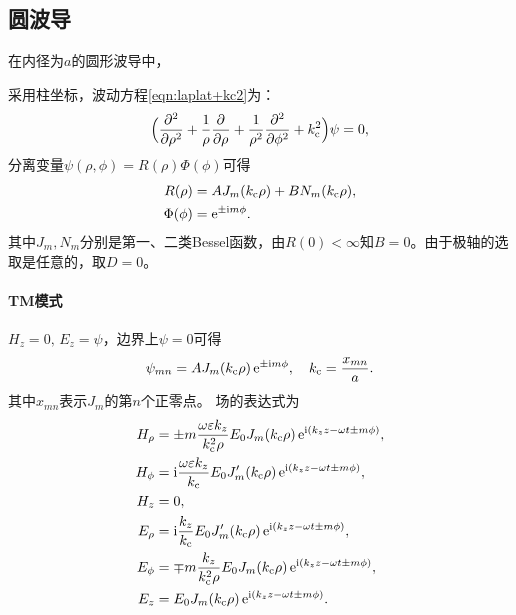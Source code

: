 \subsection{圆波导}

在内径为$a$的圆形波导中，
\begin{center}
    \label{fig:circle waveguide}
\end{center}
采用柱坐标，波动方程\eqref{eqn:laplat+kc2}为：
\begin{equation}
    \Bigkh{\pp[2]\rho+\frac1\rho\pp\rho+\frac1{\rho^2}\pp[2]\phi+k\c^2}\psi=0,
\end{equation}
分离变量$\psi(\rho,\phi)=R(\rho)\Phi(\phi)$可得
\begin{align*}
    R(\rho)&=AJ_m(k\c\rho)+BN_m(k\c\rho),\\
    \Phi(\phi)&=\e{\pm\i m\phi}.
\end{align*}
其中$J_m,N_m$分别是第一、二类Bessel函数，由$R(0)<\infty$知$B=0$。由于极轴的选取是任意的，取$D=0$。

\paragraph{TM模式}

$H_z=0,\,E_z=\psi$，边界上$\psi=0$可得
\begin{equation}
    \psi_{mn}=AJ_m(k\c\rho)\e{\pm\i m\phi},\quad k\c=\frac{x_{mn}}a.
\end{equation}
其中$x_{mn}$表示$J_m$的第$n$个正零点。
场的表达式为
\begin{subequations}
    \begin{align*}
        H_\rho&=\pm m\frac{\omega\varepsilon k_z}{k\c^2\rho}E_0J_m(k\c\rho)\e{\i(k_zz-\omega t\pm m\phi)},\\
        H_\phi&=\i\frac{\omega\varepsilon k_z}{k\c}E_0J_m'(k\c\rho)\e{\i(k_zz-\omega t\pm m\phi)},\\
        H_z&=0,\\
        E_\rho&=\i\frac{k_z}{k\c}E_0J_m'(k\c\rho)\e{\i(k_zz-\omega t\pm m\phi)},\\
        E_\phi&=\mp m\frac{k_z}{k\c^2\rho}E_0J_m(k\c\rho)\e{\i(k_zz-\omega t\pm m\phi)},\\
        E_z&=E_0J_m(k\c\rho)\e{\i(k_zz-\omega t\pm m\phi)}.
    \end{align*}
\end{subequations}

